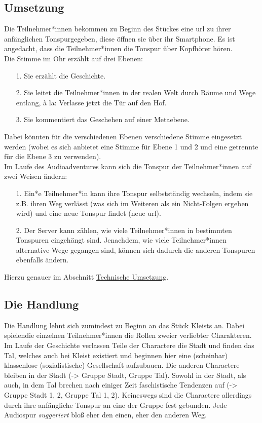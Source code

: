 \documentclass[a4paper, 12pt]{article}
\begin{document}
\subsection{Umsetzung}
Die Teilnehmer*innen bekommen zu Beginn des Stückes eine url zu ihrer anfänglichen Tonspurgegeben, diese öffnen sie über ihr Smartphone.
Es ist angedacht, dass die Teilnehmer*innen die Tonspur über Kopfhörer hören.\\

Die \glqq Stimme im Ohr\grqq{} erzählt auf drei Ebenen:
\begin{itemize}
    \item[1.] Sie erzählt die Geschichte.
    \item[2.] Sie leitet die Teilnehmer*innen in der \glqq realen Welt\grqq{} durch Räume und Wege entlang, à la: \glqq Verlasse jetzt die Tür auf den Hof\grqq .
    \item[3.] Sie kommentiert das Geschehen auf einer Metaebene.
\end{itemize}
Dabei könnten für die verschiedenen Ebenen verschiedene Stimme eingesetzt werden (wobei es sich anbietet eine Stimme für Ebene 1 und 2 und eine getrennte für die Ebene 3 zu verwenden).\\

Im Laufe des Audioadventures kann sich die Tonspur der Teilnehmer*innen auf zwei Weisen ändern:
\begin{itemize}
    \item[1.] Ein*e Teilnehmer*in kann ihre Tonspur selbstständig wechseln, indem sie z.B. ihren Weg verlässt (was sich im Weiteren als ein Nicht-Folgen ergeben wird) und eine neue Tonspur findet (neue url).
    \item[2.] Der Server kann zählen, wie viele Teilnehmer*innen in bestimmten Tonspuren \glqq eingehängt\grqq{} sind. Jenachdem, wie viele Teilnehmer*innen alternative Wege gegangen sind, können sich dadurch die anderen Tonspuren ebenfalls ändern.
\end{itemize}
Hierzu genauer im Abschnitt \hyperref[technische_umsetzung]{Technische Umsetzung}.

\subsection{Die Handlung}
Die Handlung lehnt sich zumindest zu Beginn an das Stück Kleists an. 
Dabei \glqq spielen\grqq die einzelnen Teilnehmer*innen die Rollen zweier verliebter Charakteren.
Im Laufe der Geschichte verlassen Teile der Charactere die Stadt und finden das Tal, welches auch bei Kleist existiert und beginnen hier eine (scheinbar) klassenlose (sozialistische) Gesellschaft aufzubauen.
Die anderen Charactere bleiben in der Stadt (-> Gruppe Stadt, Gruppe Tal).
Sowohl in der Stadt, als auch, in dem Tal brechen nach einiger Zeit faschistische Tendenzen auf (-> Gruppe Stadt 1, 2, Gruppe Tal 1, 2).
Keineswegs sind die Charactere allerdings durch ihre anfängliche Tonspur an eine der Gruppe fest gebunden. 
Jede Audiospur \textit{suggeriert} bloß eher den einen, eher den anderen Weg.\\
\end{document}
